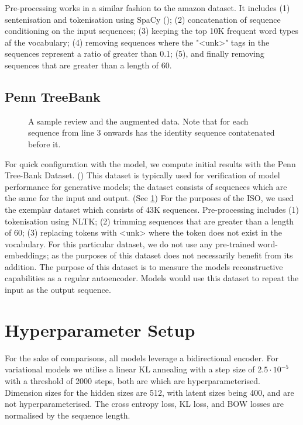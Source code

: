 \documentclass[12pt,twoside]{report}
\begin{document}
Pre-processing works in a similar fashion to the amazon dataset. It includes (1) sentenisation and tokenisation using SpaCy (\cite{honnibal_spacy_2017}); (2) concatenation of sequence conditioning on the input sequences; (3) keeping the top 10K frequent word types af the vocabulary; (4) removing sequences where the "<unk>" tags in the sequences represent a ratio of greater than 0.1; (5), and finally removing sequences that are greater than a length of 60. 

\subsection{Penn TreeBank}

\begin{figure}[!ht]
	\centering
	
	\caption{A sample review and the augmented data. Note that for each sequence from line 3 onwards has the identity sequence contatenated before it. \label{ex_dataset:ptb}}
	\end{figure}

For quick configuration with the model, we compute initial results with the Penn Tree-Bank Dataset. (\cite{marcus_building_2002}) This dataset is typically used for verification of model performance for generative models; the dataset consists of sequences which are the same for the input and output. (See \ref{ex_dataset:ptb}) For the purposes of the ISO, we used the exemplar dataset which consists of 43K sequences. Pre-processing includes (1) tokenisation using NLTK; (2) trimming sequences that are greater than a length of 60; (3) replacing tokens with <unk> where the token does not exist in the vocabulary. For this particular dataset, we do not use any pre-trained word-embeddings; as the purposes of this dataset does not necessarily benefit from its addition. The purpose of this dataset is to measure the models reconstructive capabilities as a regular autoencoder. Models would use this dataset to repeat the input as the output sequence.

\section{Hyperparameter Setup}

For the sake of comparisons, all models leverage a bidirectional encoder. For variational models we utilise a linear KL annealing with a step size of $2.5\cdot 10^{-5}$ with a threshold of 2000 steps, both are which are hyperparameterised. Dimension sizes for the hidden sizes are 512, with latent sizes being 400, and are not hyperparameterised. The cross entropy loss, KL loss, and BOW losses are normalised by the sequence length. 
\end{document}
